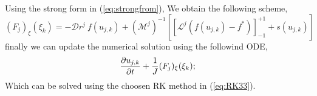 \begin{frame}
	Using the strong form in (\ref{eq:strongfrom}), We obtain the following scheme,
	\begin{equation}
		(F_j)_{\xi}(\xi_k) = -\mathcal{D}r^{j} \ f(u_{j,k}) + 
		(\mathcal{M}^j)^{-1} \left[\left[\mathcal{L}^{j}(f(u_{j,k})-f^{*})\right]_{-1}^{+1} 
		+ s(u_{j,k}) \right]
	\end{equation}
	finally we can update the numerical solution using the followind ODE,
	\begin{equation}
		\frac{\partial u_{j,k}}{\partial t} + \frac{1}{J} (F_j)_{\xi}(\xi_k);
	\end{equation}
	Which can be solved using the choosen RK method in (\ref{eq:RK33}).
\end{frame}